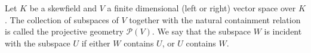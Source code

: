 Let $K$ be a skewfield and $V$ a finite dimensional (left or right) vector space over $K$. The collection of subspaces of $V$ together with the natural containment relation is called the projective geometry $\mathcal{P}(V)$. We say that the subspace $W$ is incident with the subspace $U$ if either $W$ contains $U$, or $U$ contains $W$.
